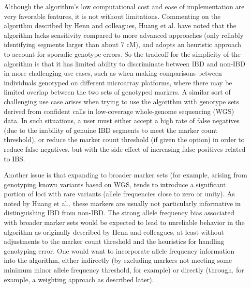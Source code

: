 \documentclass{article}
\begin{document}
Although the algorithm's low computational cost and ease of implementation are very favorable features, it is not without limitations. Commenting on the algorithm described by Henn and colleagues, Huang et al. have noted that the algorithm lacks sensitivity compared to more advanced approaches (only reliably identifying segments larger than about 7 cM), and adopts an heuristic approach to account for sporadic genotype errors.\citep{speeDB} So the tradeoff for the simplicity of the algorithm is that it has limited ability to discriminate between IBD and non-IBD in more challenging use cases, such as when making comparisons between individuals genotyped on different microarray platforms, where there may be limited overlap between the two sets of genotyped markers. A similar sort of challenging use case arises when trying to use the algorithm with genotype sets derived from confident calls in low-coverage whole-genome sequencing (WGS) data. In such situations, a user must either accept a high rate of false negatives (due to the inability of genuine IBD segments to meet the marker count threshold), or reduce the marker count threshold (if given the option) in order to reduce false negatives, but with the side effect of increasing false positives related to IBS. 

Another issue is that expanding to broader marker sets (for example, arising from genotyping known variants based on WGS, tends to introduce a significant portion of loci with rare variants (allele frequencies close to zero or unity). As noted by Huang et al.,\citep{speeDB} these markers are usually not particularly informative in distinguishing IBD from non-IBD. The strong allele frequency bias associated with broader marker sets would be expected to lead to unreliable behavior in the algorithm as originally described by Henn and colleagues, at least without adjustments to the marker count threshold and the heuristics for handling genotyping error. One would want to incorporate allele frequency information into the algorithm, either indirectly (by excluding markers not meeting some minimum minor allele frequency threshold, for example) or directly (through, for example, a weighting approach as described later).
\end{document}
